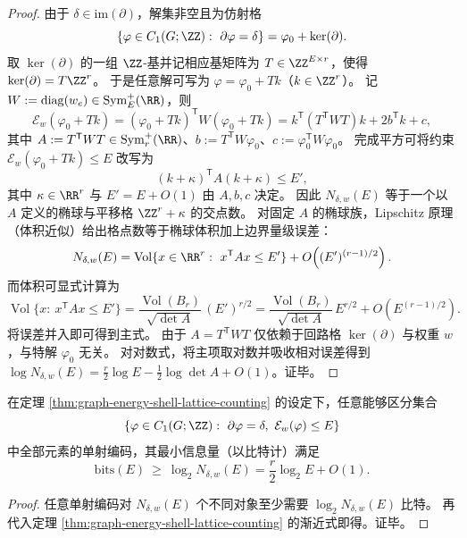 \begin{proof}
由于 \(\delta\in\mathrm{im}(\partial)\)，解集非空且为仿射格
\[
\{\varphi\in C_1(G;\ZZ):\ \partial\varphi=\delta\}=\varphi_0+\ker(\partial).
\]
取 \(\ker(\partial)\) 的一组 \(\ZZ\)-基并记相应基矩阵为 \(T\in\ZZ^{E\times r}\)，使得 \(\ker(\partial)=T\ZZ^r\)。
于是任意解可写为 \(\varphi=\varphi_0+Tk\)（\(k\in\ZZ^r\)）。
记 \(W:=\mathrm{diag}(w_e)\in\mathrm{Sym}_E^+(\RR)\)，则
\[
\mathcal E_w(\varphi_0+Tk)=(\varphi_0+Tk)^{\mathsf T}W(\varphi_0+Tk)
=k^{\mathsf T}(T^{\mathsf T}WT)k+2b^{\mathsf T}k+c,
\]
其中 \(A:=T^{\mathsf T}WT\in\mathrm{Sym}_r^+(\RR)\)、\(b:=T^{\mathsf T}W\varphi_0\)、\(c:=\varphi_0^{\mathsf T}W\varphi_0\)。
完成平方可将约束 \(\mathcal E_w(\varphi_0+Tk)\le E\) 改写为
\[
(k+\kappa)^{\mathsf T}A(k+\kappa)\le E',
\]
其中 \(\kappa\in\RR^r\) 与 \(E'=E+O(1)\) 由 \(A,b,c\) 决定。
因此 \(N_{\delta,w}(E)\) 等于一个以 \(A\) 定义的椭球与平移格 \(\ZZ^r+\kappa\) 的交点数。
对固定 \(A\) 的椭球族，Lipschitz 原理（体积近似）给出格点数等于椭球体积加上边界量级误差：
\[
N_{\delta,w}(E)=\operatorname{Vol}\{x\in\RR^r:\ x^{\mathsf T}Ax\le E'\}+O\!\left((E')^{(r-1)/2}\right).
\]
而体积可显式计算为
\[
\operatorname{Vol}\{x:\ x^{\mathsf T}Ax\le E'\}=\frac{\operatorname{Vol}(B_r)}{\sqrt{\det A}}\,(E')^{r/2}
=\frac{\operatorname{Vol}(B_r)}{\sqrt{\det A}}\,E^{r/2}+O\!\left(E^{(r-1)/2}\right).
\]
将误差并入即可得到主式。
由于 \(A=T^{\mathsf T}WT\) 仅依赖于回路格 \(\ker(\partial)\) 与权重 \(w\)，与特解 \(\varphi_0\) 无关。
对对数式，将主项取对数并吸收相对误差得到 \(\log N_{\delta,w}(E)=\frac r2\log E-\frac12\log\det A+O(1)\)。证毕。
\end{proof}

\begin{corollary}\label{cor:graph-energy-shell-bit-lower-bound}
在定理 \ref{thm:graph-energy-shell-lattice-counting} 的设定下，任意能够区分集合
\[
\left\{\varphi\in C_1(G;\ZZ):\ \partial\varphi=\delta,\ \mathcal E_w(\varphi)\le E\right\}
\]
中全部元素的单射编码，其最小信息量（以比特计）满足
\[
\mathrm{bits}(E)\ \ge\ \log_2 N_{\delta,w}(E)=\frac r2\log_2 E+O(1).
\]
\end{corollary}
\begin{proof}
任意单射编码对 \(N_{\delta,w}(E)\) 个不同对象至少需要 \(\log_2 N_{\delta,w}(E)\) 比特。
再代入定理 \ref{thm:graph-energy-shell-lattice-counting} 的渐近式即得。证毕。
\end{proof}

